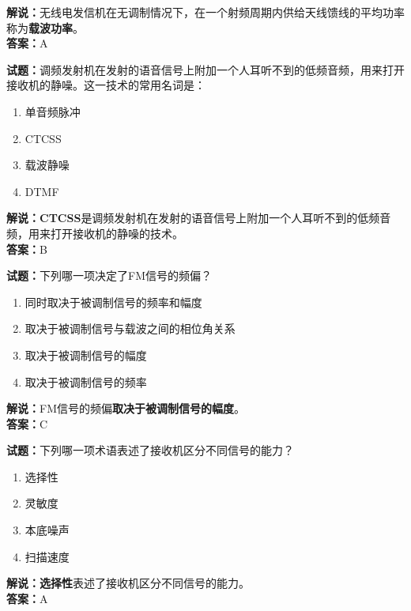 \documentclass{ctexbook}
\begin{document}
\noindent\textbf{解说：}无线电发信机在无调制情况下，在一个射频周期内供给天线馈线的平均功率称为\textbf{载波功率}。\\\noindent\textbf{答案：}A%


\bigskip


\noindent\textbf{试题：}调频发射机在发射的语音信号上附加一个人耳听不到的低频音频，用来打开接收机的静噪。这一技术的常用名词是：

\begin{enumerate}[leftmargin=3em]
	\item 单音频脉冲
	\item CTCSS
	\item 载波静噪
	\item DTMF
\end{enumerate}

\noindent\textbf{解说：}\textbf{CTCSS}是调频发射机在发射的语音信号上附加一个人耳听不到的低频音频，用来打开接收机的静噪的技术。\\\noindent\textbf{答案：}B%


\bigskip


\noindent\textbf{试题：}下列哪一项决定了FM信号的频偏？

\begin{enumerate}[leftmargin=3em]
	\item 同时取决于被调制信号的频率和幅度
	\item 取决于被调制信号与载波之间的相位角关系
	\item 取决于被调制信号的幅度
	\item 取决于被调制信号的频率
\end{enumerate}

\noindent\textbf{解说：}FM信号的频偏\textbf{取决于被调制信号的幅度}。\\\noindent\textbf{答案：}C%


\bigskip


\noindent\textbf{试题：}下列哪一项术语表述了接收机区分不同信号的能力？

\begin{enumerate}[leftmargin=3em]
	\item 选择性
	\item 灵敏度
	\item 本底噪声
	\item 扫描速度
\end{enumerate}

\noindent\textbf{解说：}\textbf{选择性}表述了接收机区分不同信号的能力。\\\noindent\textbf{答案：}A%
\end{document}
